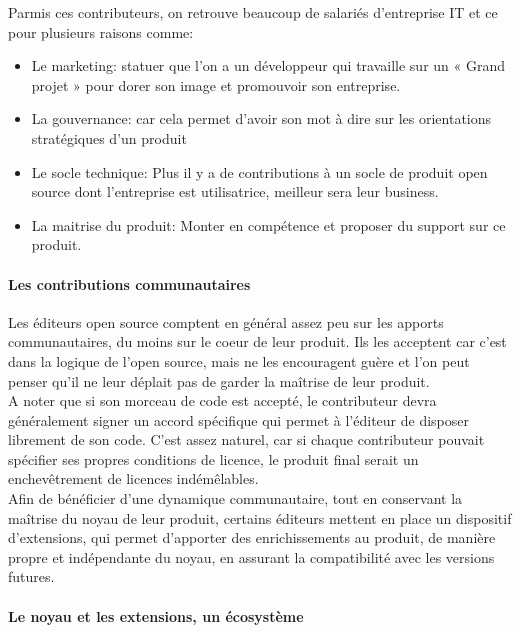 				Parmis ces contributeurs, on retrouve beaucoup de salariés d'entreprise IT et ce pour plusieurs raisons comme:

				\begin{itemize}[label=\textbullet, font=\LARGE \color{burntorange}]
					\item Le marketing: statuer que l'on a un développeur qui travaille sur un « Grand projet » pour dorer son image et promouvoir son entreprise.
					\item La gouvernance: car cela permet d'avoir son mot à dire sur les orientations stratégiques d'un produit
					\item Le socle technique: Plus il y a de contributions à un socle de produit open source dont l'entreprise est utilisatrice, meilleur sera leur business.
					\item La maitrise du produit: Monter en compétence et proposer du support sur ce produit.
				\end{itemize}

				\paragraph{Les contributions communautaires\\}

				Les éditeurs open source comptent en général assez peu sur les apports communautaires, du moins sur le coeur de leur produit. Ils les acceptent car c'est dans la logique de l'open source, mais ne les encouragent guère et l'on peut penser qu'il ne leur déplait pas de garder la maîtrise de leur produit.\\

				A noter que si son morceau de code est accepté, le contributeur devra généralement signer un accord spécifique qui permet à l'éditeur de disposer librement de son code. C'est assez naturel, car si chaque contributeur pouvait spécifier ses propres conditions de licence, le produit final serait un enchevêtrement de licences indémêlables.\\

				Afin de bénéficier d'une dynamique communautaire, tout en conservant la maîtrise du noyau de leur produit, certains éditeurs mettent en place un dispositif d'extensions, qui permet d'apporter des enrichissements au produit, de manière propre et indépendante du noyau, en assurant la compatibilité avec les versions futures.

				\paragraph{Le noyau et les extensions, un écosystème\\}

